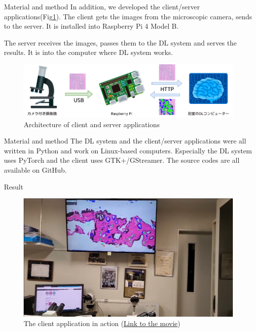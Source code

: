 \documentclass[
  dvipdfmx,
  xcolor={svgnames},
  hyperref={colorlinks,citecolor=DeepPink4,linkcolor=DarkRed,urlcolor=DarkBlue}
  ]{beamer}
\begin{document}
\begin{frame}{Material and method}
  In addition, we developed the client/server applications(Fig\ref{fig:arch}). The client gets the images from the microscopic camera, sends to the server. It is installed into Raspberry Pi 4 Model B.

  The server receives the images, passes them to the DL system and serves the results. It is into the computer where DL system works.

  \begin{figure}\centering
    \includegraphics[width=0.8\columnwidth]{assets/arch.png}
    \caption{Architecture of client and server applications}
    \label{fig:arch}
  \end{figure}
\end{frame}

\begin{frame}{Material and method}
  The DL system and the client/server applications were all written in Python and work on Linux-based computers. Especially the DL system uses PyTorch and the client uses GTK+/GStreamer. The source codes are all available on GitHub.\cite{gh-prostate}\cite{gh-pai}
\end{frame}

\begin{frame}{Result}
  \begin{figure}[t]\centering
    \includegraphics[width=\columnwidth, keepaspectratio]{assets/thumb.png}
    \caption{The client application in action (\href{https://drive.google.com/file/d/16hUGZ2jU2Def9N5ozNaZnLvjnWc-kkNP/view}{Link to the movie})}
    \label{fig:in_action}
  \end{figure}
\end{frame}
\end{document}
